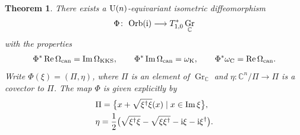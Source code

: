 \documentclass[pdftex]{sigma}
\numberwithin{equation}{section}
\newtheorem{Theorem}{Theorem}[section]
\DeclareMathOperator{\Imag}{Im}
\DeclareMathOperator{\Real}{Re}
\DeclareMathOperator{\Gr}{Gr}
\newcommand{\C}{\mathbb{C}}
\begin{document}
\begin{Theorem}%
	There exists a ${\rm U}(n)$-equivariant isometric diffeomorphism
	\begin{equation*}
		\Phi\colon \ {\rm Orb}({\rm i})\longrightarrow T^*_{1,0}\Gr_\C
	\end{equation*}
	with the properties
	\begin{gather}
			\Phi^*\Real\Omega_{\rm can}=\Imag\Omega_{\rm KKS},\qquad
			\Phi^*\Imag\Omega_{\rm can}=\omega_\textup{K},\qquad
			\Phi^*\omega_\textup{C}=\Real\Omega_{\rm can}.\label{symp_forms}
	\end{gather}
	Write $\Phi(\xi)=(\Pi,\eta)$, where $\Pi$ is an element of $\Gr_\C$ and $\eta\colon\C^n/\Pi\rightarrow\Pi$ is a covector to $\Pi$. The map $\Phi$ is given explicitly by
	\begin{align}
		&\Pi=\bigl\{x+\sqrt{\xi^\dagger \xi}(x)\mid x\in\Imag\xi\bigr\}, \label{Pi_explicit}\\
		&\eta=\frac{1}{2}\bigl(\sqrt{\xi^\dagger \xi}-\sqrt{\xi\xi^\dagger}-{\rm i}\xi-{\rm i}\xi^\dagger\bigr).\label{eta_explicit}
	\end{align}
\end{Theorem}
\end{document}
